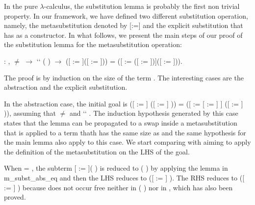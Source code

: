  In the pure $\lambda$-calculus, the substitution lemma is probably the first non trivial property. In our framework, we have defined two different substitution operation, namely, the metasubstitution denoted by [:=] and the explicit substitution that has  as a constructor. In what follows, we present the main steps of our proof of the substitution lemma for the metasubstitution operation: 
\begin{coqdoccode}
\coqdocemptyline
\coqdocnoindent
{} : \coqdockw{\ensuremath{\forall}}     ,  \ensuremath{\not=}  \ensuremath{\rightarrow}  `` ( ) \ensuremath{\rightarrow} ([ := ]([ := ])) = ([ := ([ := ])]([ := ])).\coqdoceol
\end{coqdoccode}
 The proof is by induction on the size of the term . The interesting cases are the abstraction and the explicit substitution.
\begin{coqdoccode}
\end{coqdoccode}
In the abstraction case, the initial goal is ([ := ] ([ := ]   )) = ([ := [ := ] ] ([ := ]   )), assuming that  \ensuremath{\not=}  and  ``  . The induction hypothesis generated by this case states that the lemma can be propagated to a swap inside a metasubstitution that is applied to a term thath has the same size as  and the same hypothesis for the main lemma also apply to this case. We start comparing  with  aiming to apply the definition of the metasubstitution on the LHS of the goal.
\begin{coqdoccode}
\end{coqdoccode}
When  = , the subterm [ := ](  ) is reduced to (  ) by applying the lemma in m\_subst\_abs\_eq and then the LHS reduces to ([ := ]   ). The RHS reduces to ([ := ]   ) because  does not occur free neither in (  ) nor in , which has also been proved.
